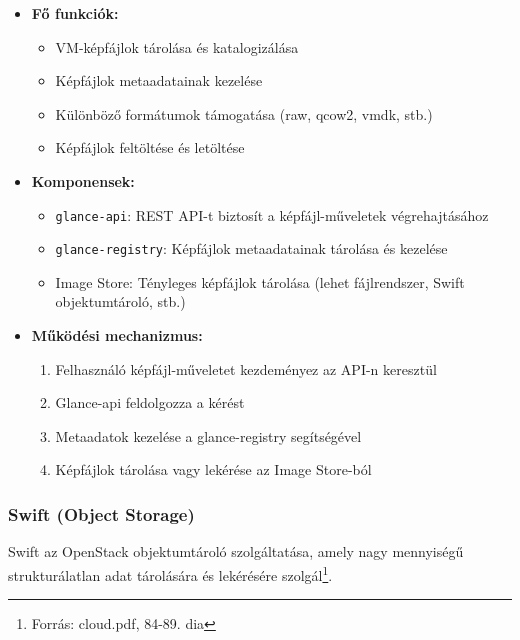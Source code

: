 \documentclass[a4paper,12pt]{article}
\begin{document}
    \begin{itemize}
        \item \textbf{Fő funkciók:}
        \begin{itemize}
            \item VM-képfájlok tárolása és katalogizálása
            \item Képfájlok metaadatainak kezelése
            \item Különböző formátumok támogatása (raw, qcow2, vmdk, stb.)
            \item Képfájlok feltöltése és letöltése
        \end{itemize}

        \item \textbf{Komponensek:}
        \begin{itemize}
            \item \texttt{glance-api}: REST API-t biztosít a képfájl-műveletek végrehajtásához
            \item \texttt{glance-registry}: Képfájlok metaadatainak tárolása és kezelése
            \item Image Store: Tényleges képfájlok tárolása (lehet fájlrendszer, Swift objektumtároló, stb.)
        \end{itemize}

        \item \textbf{Működési mechanizmus:}
        \begin{enumerate}
            \item Felhasználó képfájl-műveletet kezdeményez az API-n keresztül
            \item Glance-api feldolgozza a kérést
            \item Metaadatok kezelése a glance-registry segítségével
            \item Képfájlok tárolása vagy lekérése az Image Store-ból
        \end{enumerate}
    \end{itemize}

    \subsubsection{Swift (Object Storage)}

    Swift az OpenStack objektumtároló szolgáltatása, amely nagy mennyiségű strukturálatlan adat tárolására és lekérésére szolgál\footnote{Forrás: cloud.pdf, 84-89. dia}.
\end{document}
